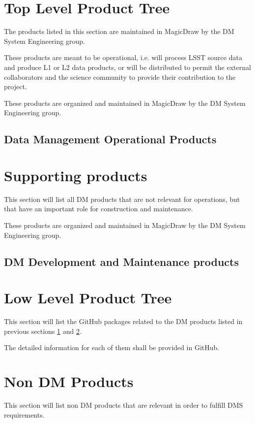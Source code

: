 \newpage
\section{Top Level Product Tree}\label{sec:top}

The products listed in this section are maintained in MagicDraw by the DM System Engineering group. 

These products are meant to be operational, i.e. will process LSST source data and produce L1 or L2 data products, or will be distributed to permit the external collaborators and the science community to provide their contribution to the project.

These products are organized and maintained in MagicDraw by the DM System Engineering group.

\newpage
\subsection{Data Management Operational Products}\label{sec:dmtop}




\newpage
\section{Supporting products}\label{sec:sups}

This section will list all DM products that are not relevant for operations, but that have an important role for construction and maintenance.

These products are organized and maintained in MagicDraw by the DM System Engineering group.
\newpage
\subsection{DM Development and Maintenance products}



\newpage
\section{Low Level Product Tree}\label{sec:low}

This section will list the GitHub packages related to the DM products listed in previous sections \ref{sec:top} and \ref{sec:sups}.

The detailed information for each of them shall be provided in GitHub.

%


\newpage
\section{Non DM Products}\label{sec:nondm}

This section will list non DM products that are relevant in order to fulfill DMS requirements.
